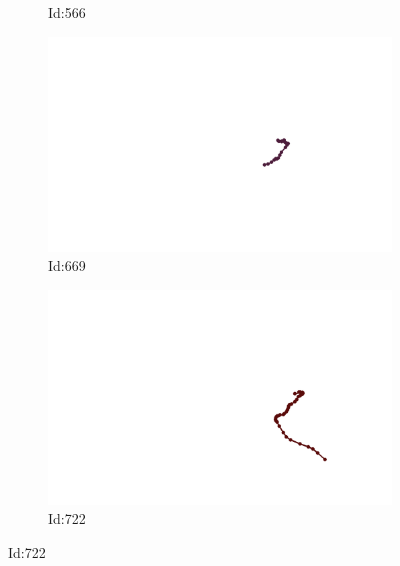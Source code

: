 \documentclass[12pt,twoside]{report}
\begin{document}
\begin{figure}
\begin{subfigure}[b]{0.20\textwidth}
\caption{Id:566}
\end{subfigure}
\begin{subfigure}[b]{0.20\textwidth}
\centering
\includegraphics[width=\textwidth]{../../trajectories/669.png}
\caption{Id:669}
\end{subfigure}
\begin{subfigure}[b]{0.20\textwidth}
\centering
\includegraphics[width=\textwidth]{../../trajectories/722.png}
\caption{Id:722}
\end{subfigure}
\end{figure}
\end{document}

